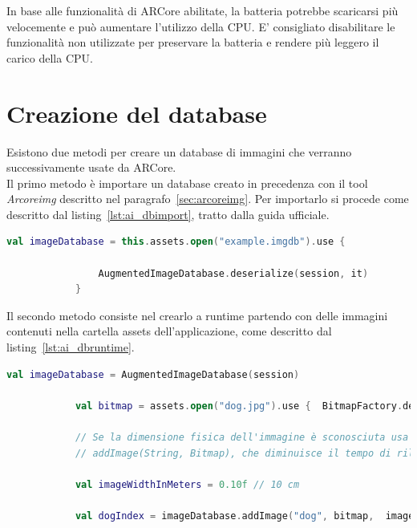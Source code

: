 \documentclass[crop=false, class=book]{standalone}
\begin{document}
	In base alle funzionalità di ARCore abilitate, la batteria potrebbe scaricarsi più velocemente e può aumentare l’utilizzo della CPU. E’ consigliato disabilitare le funzionalità non utilizzate per preservare la batteria e rendere più leggero il carico della CPU.
	
	\section{Creazione del database}
	Esistono due metodi per creare un database di immagini che verranno successivamente usate da ARCore.\\
	
	\noindent
	Il primo metodo è importare un database creato in precedenza con il tool \textit{Arcoreimg} descritto nel paragrafo~\vref{sec:arcoreimg}.
	Per importarlo si procede come descritto dal listing~\vref{lst:ai_dbimport}, tratto dalla guida ufficiale.
	
	\begin{center}
		\begin{minipage}{0.95\textwidth}
			\begin{lstlisting}[caption={Importazione database.}, label={lst:ai_dbimport}, language=Kotlin]
			val imageDatabase = this.assets.open("example.imgdb").use {
		 	
		 		AugmentedImageDatabase.deserialize(session, it)
			}
			\end{lstlisting}
		\end{minipage}
	\end{center}
	
	\noindent
	Il secondo metodo consiste nel crearlo a runtime partendo con delle immagini contenuti nella cartella assets dell’applicazione, come descritto dal listing~\vref{lst:ai_dbruntime}.
	
	\begin{center}
		\begin{minipage}{0.95\textwidth}
			\begin{lstlisting}[caption={Creazione del database.}, label={lst:ai_dbruntime}, language=Kotlin]
			val imageDatabase = AugmentedImageDatabase(session)
			
			val bitmap = assets.open("dog.jpg").use {  BitmapFactory.decodeStream(it) }
			
			// Se la dimensione fisica dell'immagine è sconosciuta usa il metodo 
			// addImage(String, Bitmap), che diminuisce il tempo di rilevamento dell'immagine.
			
			val imageWidthInMeters = 0.10f // 10 cm
			
			val dogIndex = imageDatabase.addImage("dog", bitmap,  imageWidthInMeters)
			\end{lstlisting}
		\end{minipage}
	\end{center}
	
\end{document}
